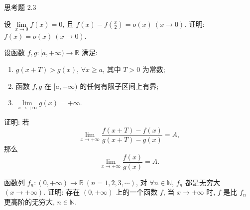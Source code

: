 \begin{exblock}{思考题 2.3}
\item 设 $\lim\limits_{x\to0} f(x) = 0$, 且 $f(x) - f\left(\frac{x}{2}\right) = o(x)\ (x \to 0)$. 证明: $f(x) = o(x)\ (x \to 0)$.

\item 设函数 $f, g: [a, +\infty) \to \mathbb{R}$ 满足:
  \begin{enumerate}[label=(\arabic*)]
    \item $g(x+T) > g(x)$, $\forall x \geqslant a$, 其中 $T > 0$ 为常数;
    \item 函数 $f, g$ 在 $[a, +\infty)$ 的任何有限子区间上有界;
    \item $\lim\limits_{x\to+\infty} g(x) = +\infty$.
  \end{enumerate}
  证明: 若
  \[
  \lim_{x\to+\infty}\frac{f(x+T) - f(x)}{g(x+T) - g(x)} = A,
\]
  那么
  \[
  \lim_{x\to+\infty}\frac{f(x)}{g(x)} = A.
\]

\item 函数列 $f_n: (0, +\infty) \to \mathbb{R}\ (n = 1, 2, 3, \cdots)$, 对 $\forall n \in \mathbb{N}$, $f_n$ 都是无穷大 $(x \to +\infty)$. 证明: 存在 $(0, +\infty)$ 上的一个函数 $f$, 当 $x \to +\infty$ 时, $f$ 是比 $f_n$ 更高阶的无穷大, $n \in \mathbb{N}$.
\end{exblock}
